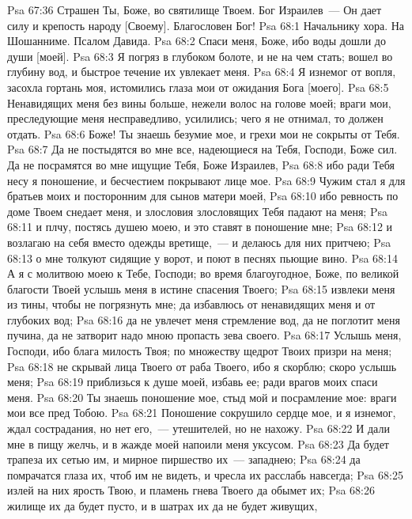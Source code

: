 \vs Psa 67:36 Страшен Ты, Боже, во святилище Твоем. Бог Израилев~--- Он дает силу и крепость народу [Своему]. Благословен Бог!
\vs Psa 68:1 Начальнику хора. На Шошанниме. Псалом Давида.
\rsbpar\vs Psa 68:2 Спаси меня, Боже, ибо воды дошли до души [моей].
\vs Psa 68:3 Я погряз в глубоком болоте, и не на чем стать; вошел во глубину вод, и быстрое течение их увлекает меня.
\vs Psa 68:4 Я изнемог от вопля, засохла гортань моя, истомились глаза мои от ожидания Бога [моего].
\vs Psa 68:5 Ненавидящих меня без вины больше, нежели волос на голове моей; враги мои, преследующие меня несправедливо, усилились; чего я не отнимал, то должен отдать.
\vs Psa 68:6 Боже! Ты знаешь безумие мое, и грехи мои не сокрыты от Тебя.
\vs Psa 68:7 Да не постыдятся во мне все, надеющиеся на Тебя, Господи, Боже сил. Да не посрамятся во мне ищущие Тебя, Боже Израилев,
\vs Psa 68:8 ибо ради Тебя несу я поношение, и бесчестием покрывают лице мое.
\vs Psa 68:9 Чужим стал я для братьев моих и посторонним для сынов матери моей,
\vs Psa 68:10 ибо ревность по доме Твоем снедает меня, и злословия злословящих Тебя падают на меня;
\vs Psa 68:11 и плчу, постясь душею моею, и это ставят в поношение мне;
\vs Psa 68:12 и возлагаю на себя вместо одежды вретище,~--- и делаюсь для них притчею;
\vs Psa 68:13 о мне толкуют сидящие у ворот, и поют в песнях пьющие вино.
\vs Psa 68:14 А я с молитвою моею к Тебе, Господи; во время благоугодное, Боже, по великой благости Твоей услышь меня в истине спасения Твоего;
\vs Psa 68:15 извлеки меня из тины, чтобы не погрязнуть мне; да избавлюсь от ненавидящих меня и от глубоких вод;
\vs Psa 68:16 да не увлечет меня стремление вод, да не поглотит меня пучина, да не затворит надо мною пропасть зева своего.
\vs Psa 68:17 Услышь меня, Господи, ибо блага милость Твоя; по множеству щедрот Твоих призри на меня;
\vs Psa 68:18 не скрывай лица Твоего от раба Твоего, ибо я скорблю; скоро услышь меня;
\vs Psa 68:19 приблизься к душе моей, избавь ее; ради врагов моих спаси меня.
\vs Psa 68:20 Ты знаешь поношение мое, стыд мой и посрамление мое: враги мои все пред Тобою.
\vs Psa 68:21 Поношение сокрушило сердце мое, и я изнемог, ждал сострадания, но нет его,~--- утешителей, но не нахожу.
\vs Psa 68:22 И дали мне в пищу желчь, и в жажде моей напоили меня уксусом.
\vs Psa 68:23 Да будет трапеза их сетью им, и мирное пиршество их~--- западнею;
\vs Psa 68:24 да помрачатся глаза их, чтоб им не видеть, и чресла их расслабь навсегда;
\vs Psa 68:25 излей на них ярость Твою, и пламень гнева Твоего да обымет их;
\vs Psa 68:26 жилище их да будет пусто, и в шатрах их да не будет живущих,
